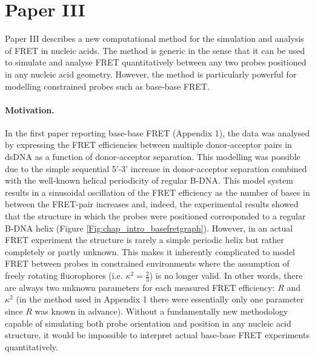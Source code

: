 \section{Paper III}
 Paper III describes a new computational method for the simulation and analysis of FRET in nucleic acids. The method is generic in the sense that it can be used to simulate and analyse FRET quantitatively between any two probes positioned in any nucleic acid geometry. However, the method is particularly powerful for modelling constrained probes such as base-base FRET.

 \paragraph{Motivation.} In the first paper reporting base-base FRET (Appendix 1), the data was analysed by expressing the FRET efficiencies between multiple donor-acceptor pairs in dsDNA as a function of donor-acceptor separation.\cite{Borjesson2009a} This modelling was possible due to the simple sequential 5'-3' increase in donor-acceptor separation combined with the well-known helical periodicity of regular B-DNA. This model system results in a sinusoidal oscillation of the FRET efficiency as the number of bases in between the FRET-pair increases and, indeed, the experimental results showed that the structure in which the probes were positioned corresponded to a regular B-DNA helix (Figure \ref{Fig:chap_intro_basefretgraph}). However, in an actual FRET experiment the structure is rarely a simple periodic helix but rather completely or partly unknown. This makes it inherently complicated to model FRET between probes in constrained environments where the assumption of freely rotating fluorophores (i.e. $\kappa^2=\frac{2}{3}$) is no longer valid. In other words, there are always two unknown parameters for each measured FRET efficiency: $R$ and $\kappa^2$ (in the method used in Appendix 1 there were essentially only one parameter since $R$ was known in advance). Without a fundamentally new methodology capable of simulating both probe orientation and position in any nucleic acid structure, it would be impossible to interpret actual base-base FRET experiments quantitatively.

